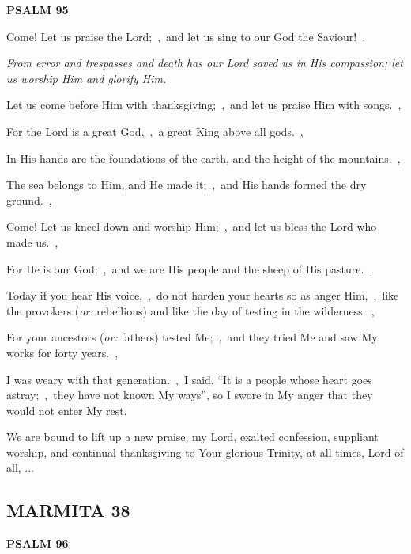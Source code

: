 \documentclass[12pt,twoside,a5paper]{article}
\newcommand{\marmita}[1]{\subsection*{MARMITA {#1}}}
\newcommand{\psalm}[1]{\textbf{PSALM {#1}}\nopagebreak}
\newcommand{\qanona}[1]{{\liturgicalhint{Qanona.} \emph{#1}}}
\newcommand{\slota}[1]{\liturgicalhint{Slota.} #1}
\newcommand{\translationoption}[1]{\emph{or:} #1}
\begin{document}
\psalm{95}

\begin{normalparskip}
  Come! Let us praise the Lord;~\sep\ and let us sing to our God the Saviour!~\sep

  \qanona{From error and trespasses and death has our Lord saved us in His compassion; let us worship Him and glorify Him.}

  Let us come before Him with thanksgiving;~\sep\ and let us praise Him with songs.~\sep

  For the Lord is a great God,~\sep\ a great King above all gods.~\sep

  In His hands are the foundations of the earth, and the height of the mountains.~\sep

  The sea belongs to Him, and He made it;~\sep\ and His hands formed the dry ground.~\sep

  Come! Let us kneel down and worship Him;~\sep\ and let us bless the Lord who made us.~\sep

  For He is our God;~\sep\ and we are His people and the sheep of His pasture.~\sep

  Today if you hear His voice,~\sep\ do not harden your hearts so as anger Him,~\sep\ like the provokers (\translationoption{rebellious}) and like the day of testing in the wilderness.~\sep

  For your ancestors (\translationoption{fathers}) tested Me;~\sep\ and they tried Me and saw My works for forty years.~\sep

  I was weary with that generation.~\sep\ I said, ``It is a people whose heart goes astray;~\sep\ they have not known My ways'', so I swore in My anger that they would not enter My rest.
\end{normalparskip}

\slota{We are bound to lift up a new praise, my Lord, exalted confession, suppliant worship, and continual thanksgiving to Your glorious Trinity, at all times, Lord of all, ...}

\marmita{38}

\psalm{96}
\end{document}
